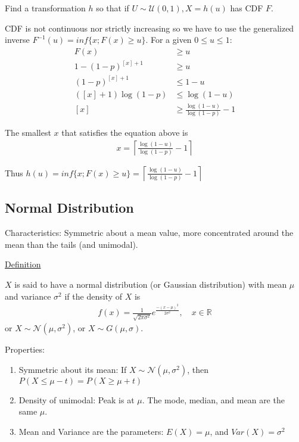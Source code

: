 \documentclass{article}
\begin{document}
Find a transformation $h$ so that if $U \sim \mathcal{U}(0,1), X = h(u)$ has CDF $F$. 

CDF is not continuous nor strictly increasing so we have to use the generalized inverse $F^{-1}(u) = inf\{x; F(x) \ge u\}$. For a given $0 \le u \le 1$:
\begin{align*}
    F(x) &\ge u \\
    1 - (1-p)^{[x]+1} &\ge u \\
    (1-p)^{[x]+1} &\le 1 - u \\
    ([x]+1)\log(1-p) &\le \log(1-u) \\
    [x] & \ge \frac{\log(1-u)}{\log(1-p)} -1 
\end{align*}

The smallest $x$ that satisfies the equation above is
\begin{align*}
    x = \left \lceil \frac{\log(1-u)}{\log(1-p)}-1 \right \rceil
\end{align*}

Thus $h(u) = inf\{x;F(x) \ge u\} = \left \lceil \frac{\log(1-u)}{\log(1-p)}-1 \right \rceil$

\subsection{Normal Distribution}

Characteristics: Symmetric about a mean value, more concentrated around the mean than the tails (and unimodal). 

\underline{Definition}

$X$ is said to have a normal distribution (or Gaussian distribution) with mean $\mu$ and variance $\sigma^2$ if the density of $X$ is
\begin{align*}
    f(x) = \frac{1}{\sqrt{2\pi \sigma^2}}e^{\frac{-(x-\mu)^2}{2\sigma^2}}, \quad x \in \mathbb{R}
\end{align*}
or $X \sim \mathcal{N}(\mu, \sigma^2)$, or $X \sim G(\mu, \sigma)$.

Properties:
\begin{enumerate}
    \item Symmetric about its mean: If $X \sim \mathcal{N}(\mu, \sigma^2)$, then $P(X \le \mu - t) = P(X \ge \mu + t)$
    \item Density of unimodal: Peak is at $\mu$. The mode, median, and mean are the same $\mu$. 
    \item Mean and Variance are the parameters: $E(X) = \mu$, and $Var(X) = \sigma^2$
\end{enumerate}
\end{document}
